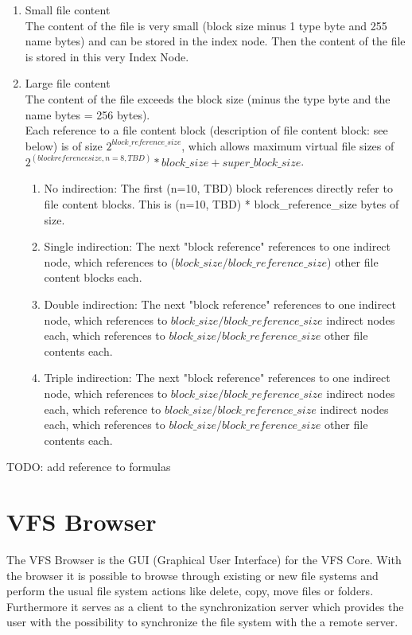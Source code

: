\documentclass[a4paper,12pt]{article}
\begin{document}
\begin{enumerate}
  \item Small file content\\
  The content of the file is very small (block size minus 1 type byte and 255 name bytes) and can be stored in the index node. Then the content of the file is stored in this very Index Node.
  \item Large file content\\
The content of the file exceeds the block size (minus the type byte and the name bytes = 256 bytes).\\
Each reference to a file content block (description of file content block: see below) is of size $2^{block\_reference\_size}$, which allows maximum virtual file sizes of $2^{(block reference size, n=8, TBD)} * block\_size + super\_block\_size$.\\
\begin{enumerate}
  \item No indirection: The first (n=10, TBD) block references directly refer to file content blocks. This is (n=10, TBD) * block\_reference\_size bytes of size.
  \item Single indirection: The next "block reference" references to one indirect node, which references to ($block\_size / block\_reference\_size$) other file content blocks each.
  \item Double indirection: The next "block reference" references to one indirect node, which references to $block\_size / block\_reference\_size$ indirect nodes each, which references to $block\_size / block\_reference\_size$ other file contents each.
  \item Triple indirection: The next "block reference" references to one indirect node, which references to $block\_size / block\_reference\_size$ indirect nodes each, which reference to $block\_size / block\_reference\_size$ indirect nodes each, which references to $block\_size / block\_reference\_size$ other file contents each.
\end{enumerate}
\end{enumerate}

TODO: add reference to formulas\\


\section{VFS Browser}
The VFS Browser is the GUI (Graphical User Interface) for the VFS Core.
With the browser it is possible to browse through existing or new file systems and perform the usual file system actions like delete, copy, move files or folders. Furthermore it serves as a client to the synchronization server which provides the user with the possibility to synchronize the file system with the a remote server.
\end{document}
